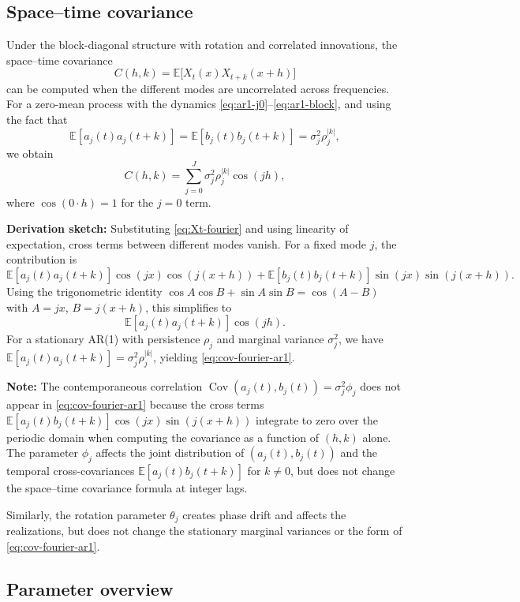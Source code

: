 \documentclass[answers,12pt,addpoints]{exam}
\begin{document}
\subsection{Space--time covariance}

Under the block-diagonal structure with rotation and correlated innovations, the space--time covariance
\[
  C(h,k) = \mathbb{E}\bigl[ X_t(x) X_{t+k}(x+h) \bigr]
\]
can be computed when the different modes are uncorrelated across frequencies. For a zero-mean process with the dynamics \eqref{eq:ar1-j0}--\eqref{eq:ar1-block}, and using the fact that
\[
  \mathbb{E}[a_j(t)a_j(t+k)] = \mathbb{E}[b_j(t)b_j(t+k)] = \sigma_j^2 \rho_j^{|k|},
\]
we obtain
\begin{equation}
  C(h,k)
  =
  \sum_{j=0}^{J}
  \sigma_j^2 \rho_j^{|k|} \cos(jh),
  \label{eq:cov-fourier-ar1}
\end{equation}
where $\cos(0\cdot h)=1$ for the $j=0$ term.

\textbf{Derivation sketch:} Substituting \eqref{eq:Xt-fourier} and using linearity of expectation, cross terms between different modes vanish. For a fixed mode $j$, the contribution is
\[
  \mathbb{E}[a_j(t)a_j(t+k)]\cos(jx)\cos(j(x+h))
  +
  \mathbb{E}[b_j(t)b_j(t+k)]\sin(jx)\sin(j(x+h)).
\]
Using the trigonometric identity $\cos A\cos B + \sin A\sin B = \cos(A-B)$ with $A=jx$, $B=j(x+h)$, this simplifies to
\[
  \mathbb{E}[a_j(t)a_j(t+k)]\cos(jh).
\]
For a stationary AR(1) with persistence $\rho_j$ and marginal variance $\sigma_j^2$, we have $\mathbb{E}[a_j(t)a_j(t+k)] = \sigma_j^2\rho_j^{|k|}$, yielding \eqref{eq:cov-fourier-ar1}.

\textbf{Note:} The contemporaneous correlation $\operatorname{Cov}(a_j(t), b_j(t)) = \sigma_j^2\phi_j$ does not appear in \eqref{eq:cov-fourier-ar1} because the cross terms $\mathbb{E}[a_j(t)b_j(t+k)]\cos(jx)\sin(j(x+h))$ integrate to zero over the periodic domain when computing the covariance as a function of $(h,k)$ alone. The parameter $\phi_j$ affects the joint distribution of $(a_j(t), b_j(t))$ and the temporal cross-covariances $\mathbb{E}[a_j(t)b_j(t+k)]$ for $k\neq0$, but does not change the space--time covariance formula at integer lags.

Similarly, the rotation parameter $\theta_j$ creates phase drift and affects the realizations, but does not change the stationary marginal variances or the form of \eqref{eq:cov-fourier-ar1}.

\subsection{Parameter overview}
\end{document}

